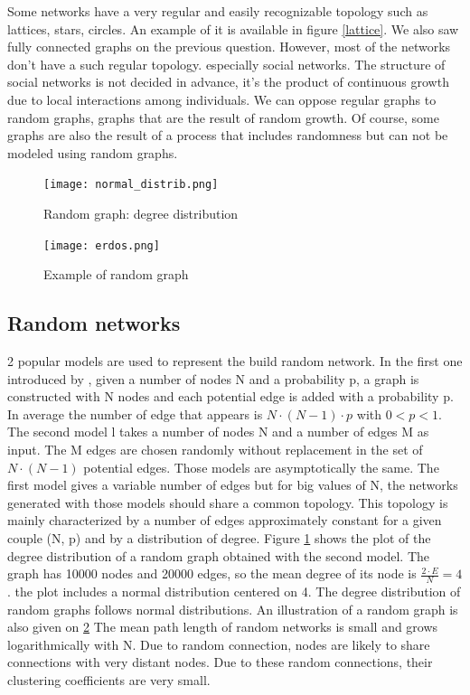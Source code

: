 \documentclass[a4paper, 12pt]{report}
\begin{document}
Some networks have a very regular and easily recognizable topology such as lattices, stars, circles. An example of it is available in figure \ref{lattice}. We also saw fully connected graphs on the previous question. However, most of the networks don't have a such regular topology. especially social networks. The structure of social networks is not decided in advance, it's the product of continuous growth due to local interactions among individuals. We can oppose regular graphs to random graphs, graphs that are the result of random growth. Of course, some graphs are also the result of a process that includes randomness but can not be modeled using random graphs.\\
\begin{figure}
\centering
\texttt{[image: normal\_distrib.png]}
\caption{Random graph: degree distribution}
\label{random}
\end{figure}

\begin{figure}
\centering
\texttt{[image: erdos.png]}
\caption{Example of random graph\citep{erdos_image}}
\label{erdos}
\end{figure}

\subsection{Random networks}
\label{random-section}
2 popular models are used to represent the build random network. In the first one introduced by \cite{erdosRandom}, given a number of nodes N and a probability p, a graph is constructed with N nodes and each potential edge is added with a probability p. In average the number of edge that appears is $N \cdot (N-1) \cdot p$ with $ 0< p <1$. The second model \citep{gilbertRandom} l takes a number of nodes N and a number of edges M as input. The M edges are chosen randomly without replacement in the set of $N \cdot (N-1)$ potential edges. Those models are asymptotically the same. The first model gives a variable number of edges but for big values of N, the networks generated with those models should share a common topology. This topology is mainly characterized by a number of edges approximately constant for a given couple (N, p) and by a distribution of degree. Figure \ref{random} shows the plot of the degree distribution of a random graph obtained with the second model. The graph has 10000 nodes and 20000 edges, so the mean degree of its node is $\frac{2 \cdot E}{N} = 4$. the plot includes a normal distribution centered on 4. The degree distribution of random graphs follows normal distributions. An illustration of a random graph is also given on \ref{erdos} The mean path length of random networks is small and grows logarithmically with N. Due to random connection, nodes are likely to share connections with very distant nodes. Due to these random connections, their clustering coefficients are very small.\\
\end{document}
